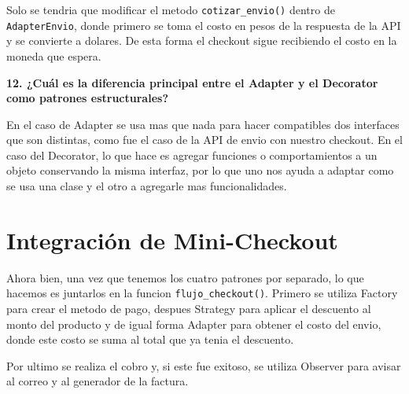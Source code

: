 \documentclass[letterpaper,11pt]{article}
\begin{document}
Solo se tendria que modificar el metodo \texttt{cotizar\_envio()} dentro de \texttt{AdapterEnvio}, donde primero se toma el costo en pesos de la respuesta de la API y se convierte a dolares. De esta forma el checkout sigue recibiendo el costo en la moneda que espera.

\textbf{12. ¿Cuál es la diferencia principal entre el Adapter y el Decorator como patrones estructurales?}

En el caso de Adapter se usa mas que nada para hacer compatibles dos interfaces que son distintas, como fue el caso de la API de envio con nuestro checkout. En el caso del Decorator, lo que hace es agregar funciones o comportamientos a un objeto conservando la misma interfaz, por lo que uno nos ayuda a adaptar como se usa una clase y el otro a agregarle mas funcionalidades.

\section{Integración de Mini-Checkout}


Ahora bien, una vez que tenemos los cuatro patrones por separado, lo que hacemos es juntarlos en la funcion \texttt{flujo\_checkout()}. Primero se utiliza Factory para crear el metodo de pago, despues Strategy para aplicar el descuento al monto del producto y de igual forma Adapter para obtener el costo del envio, donde este costo se suma al total que ya tenia el descuento.

Por ultimo se realiza el cobro y, si este fue exitoso, se utiliza Observer para avisar al correo y al generador de la factura.
\end{document}
